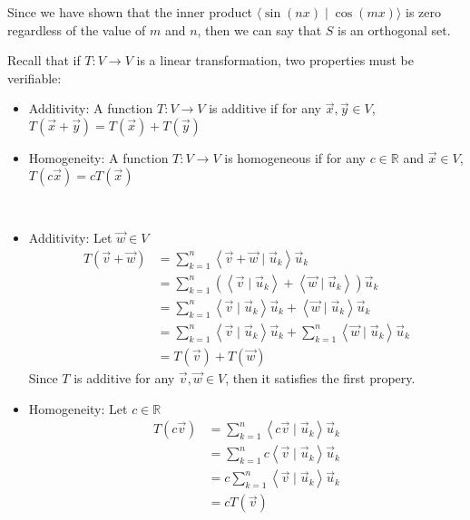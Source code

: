 \documentclass{report}
\begin{document}
Since we have shown that the inner product $\langle \sin(nx) \mid \cos(mx) \rangle$ is zero regardless of the value of $m$ and $n$, then we can say that $S$ is an orthogonal set.
\begin{note}
Recall that if $T: V \rightarrow V$ is a linear transformation, two properties must be verifiable:
\begin{itemize}
\item Additivity: A function $T: V \rightarrow V$ is additive if for any $\vec{x},\vec{y}\in V$, $T(\vec{x} + \vec{y}) = T(\vec{x}) + T(\vec{y})$
\item Homogeneity: A function $T: V \rightarrow V$ is homogeneous if for any $c\in\mathbb{R}$ and $\vec{x}\in V$, $T(c\vec{x}) = cT(\vec{x})$
\end{itemize}
\end{note}
\sol \\
\begin{itemize}
\item Additivity: Let $\vec{w}\in V$
$$
\begin{aligned}
T(\vec{v} + \vec{w}) &= \sum_{k=1}^n \left\langle\vec{v} + \vec{w} \mid \vec{u}_k\right\rangle \vec{u}_k\\
&=\sum_{k=1}^n \left(\left\langle\vec{v} \mid \vec{u}_k \right\rangle + \left\langle\vec{w} \mid \vec{u}_k\right\rangle\right)\vec{u}_k\\
&=\sum_{k=1}^n \left\langle\vec{v} \mid \vec{u}_k \right\rangle\vec{u}_k + \left\langle\vec{w} \mid \vec{u}_k\right\rangle\vec{u}_k\\
&=\sum_{k=1}^n \left\langle\vec{v} \mid \vec{u}_k \right\rangle\vec{u}_k + \sum_{k=1}^n\left\langle\vec{w} \mid \vec{u}_k\right\rangle\vec{u}_k\\
&=T(\vec{v}) + T(\vec{w})
\end{aligned}
$$
Since $T$ is additive for any $\vec{v},\vec{w}\in V$, then it satisfies the first propery.
\item Homogeneity: Let $c\in\mathbb{R}$
$$
\begin{aligned}
T(c\vec{v}) &= \sum_{k=1}^n \left\langle c\vec{v} \mid \vec{u}_k \right\rangle \vec{u}_k\\
&=\sum_{k=1}^n c\left\langle\vec{v}\mid\vec{u}_k\right\rangle\vec{u}_k\\
&=c\sum_{k=1}^n\left\langle\vec{v}\mid\vec{u}_k\right\rangle\vec{u}_k\\
&=cT(\vec{v})
\end{aligned}
$$
\end{itemize}
\end{document}
